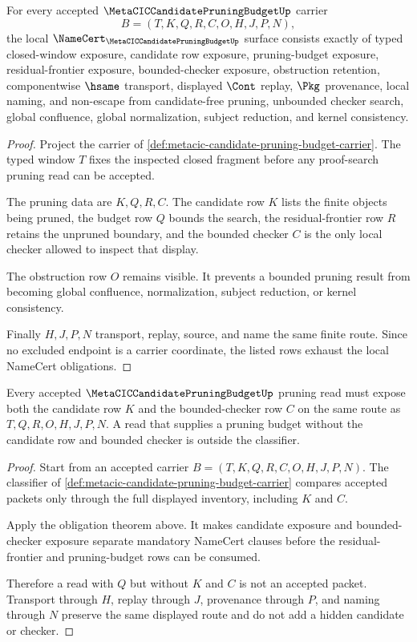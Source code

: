 \begin{theorem}
\label{thm:metacic-candidate-pruning-budget-obligations}
For every accepted $\MetaCICCandidatePruningBudgetUp$ carrier
$$
B=(T,K,Q,R,C,O,H,J,P,N),
$$
the local $\NameCert_{\MetaCICCandidatePruningBudgetUp}$ surface consists exactly of typed closed-window exposure, candidate row exposure, pruning-budget exposure, residual-frontier exposure, bounded-checker exposure, obstruction retention, componentwise $\hsame$ transport, displayed $\Cont$ replay, $\Pkg$ provenance, local naming, and non-escape from candidate-free pruning, unbounded checker search, global confluence, global normalization, subject reduction, and kernel consistency.
\end{theorem}
\begin{proof}
Project the carrier of \autoref{def:metacic-candidate-pruning-budget-carrier}. The typed window $T$ fixes the inspected closed fragment before any proof-search pruning read can be accepted.

The pruning data are $K,Q,R,C$. The candidate row $K$ lists the finite objects being pruned, the budget row $Q$ bounds the search, the residual-frontier row $R$ retains the unpruned boundary, and the bounded checker $C$ is the only local checker allowed to inspect that display.

The obstruction row $O$ remains visible. It prevents a bounded pruning result from becoming global confluence, normalization, subject reduction, or kernel consistency.

Finally $H,J,P,N$ transport, replay, source, and name the same finite route. Since no excluded endpoint is a carrier coordinate, the listed rows exhaust the local NameCert obligations.
\end{proof}

\begin{theorem}
\label{thm:metacic-candidate-pruning-bounded-checker-rejection}
Every accepted $\MetaCICCandidatePruningBudgetUp$ pruning read must expose both the candidate row $K$ and the bounded-checker row $C$ on the same route as $T,Q,R,O,H,J,P,N$. A read that supplies a pruning budget without the candidate row and bounded checker is outside the classifier.
\end{theorem}
\begin{proof}
Start from an accepted carrier $B=(T,K,Q,R,C,O,H,J,P,N)$. The classifier of \autoref{def:metacic-candidate-pruning-budget-carrier} compares accepted packets only through the full displayed inventory, including $K$ and $C$.

Apply the obligation theorem above. It makes candidate exposure and bounded-checker exposure separate mandatory NameCert clauses before the residual-frontier and pruning-budget rows can be consumed.

Therefore a read with $Q$ but without $K$ and $C$ is not an accepted packet. Transport through $H$, replay through $J$, provenance through $P$, and naming through $N$ preserve the same displayed route and do not add a hidden candidate or checker.
\end{proof}

